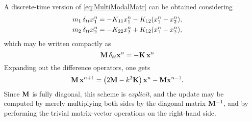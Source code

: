 A discrete-time version of \eqref{eq:MultiModalMatr} can be obtained considering
\begin{subequations}\label{eq:TwoMassFD1}
\begin{align}
m_1 \, \delta_{tt} x_1^n = -K_{11}x_1^n - K_{12}(x_1^n - x_2^n), \label{eq:CouplFD1} \\
m_2 \, \delta_{tt} x_2^n = -K_{22}x_2^n + K_{12}(x_1^n - x_2^n), \label{eq:CouplFD2}
\end{align}
\end{subequations} 
which may be written compactly as
\begin{equation}\label{eq:TwoMassFD1Compact}
{\bf M}\, \delta_{tt} {\bf x}^n = - {\bf K}\, {\bf x}^n
\end{equation}
Expanding out the difference operators, one gets
\begin{equation}\label{eq:updateExplicitScheme}
{\bf M}\, {\bf x}^{n+1} = \left(2{\bf M}-k^2{\bf K}\right){\bf x}^n - {\bf M}{\bf x}^{n-1}.
\end{equation}
Since ${\bf M}$ is fully diagonal, this scheme is \emph{explicit}, and the update may be computed by merely multiplying both sides by the diagonal matrix ${\bf M}^{-1}$, and by performing the trivial matrix-vector operations on the right-hand side. 



